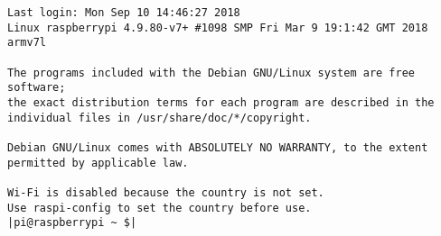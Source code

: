 \begin{lstlisting}
Last login: Mon Sep 10 14:46:27 2018
Linux raspberrypi 4.9.80-v7+ #1098 SMP Fri Mar 9 19:1:42 GMT 2018 armv7l

The programs included with the Debian GNU/Linux system are free software;
the exact distribution terms for each program are described in the
individual files in /usr/share/doc/*/copyright.

Debian GNU/Linux comes with ABSOLUTELY NO WARRANTY, to the extent
permitted by applicable law.

Wi-Fi is disabled because the country is not set.
Use raspi-config to set the country before use.
|pi@raspberrypi ~ $|
\end{lstlisting}
